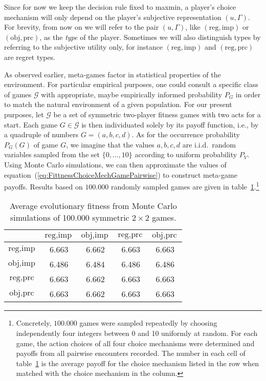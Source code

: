 \documentclass[fleqn,reqno,12pt]{article}
\theoremstyle{Satz}
\theoremstyle{Bsp}
\begin{document}
Since for now we keep the decision rule fixed to maxmin, a player's choice mechanism will only depend on the player's subjective representation $ (u,\Gamma) $. For brevity, from now on we will refer to the pair $ (u,\Gamma)$, like $(\text{reg}, \text{imp})$ or $(\text{obj}, \text{prc})$, as the \textit{type} of the player. Sometimes we will also distinguish types by referring to the subjective utility only, for instance $(\text{reg}, \text{imp})$ and $(\text{reg}, \text{prc})$ are regret types.

As observed earlier, meta-games factor in statistical properties of the environment. For particular
empirical purposes, one could consult a specific class of games $\mathcal{G}$ with appropriate,
maybe empirically informed probability $P_G$ in order to match the natural
environment of a given population. For our present purposes, let $\mathcal{G}$ be a set of symmetric
two-player fitness games with two acts for a start. Each game $G \in \mathcal{G}$ is then individuated solely by its payoff
function, i.e., by a quadruple of numbers $G=(a,b,c,d)$. As for the occurrence probability
$P_G(G)$ of game $G$, we imagine that the values $a,b,c,d$ are i.i.d.~random
variables sampled from the set $ \lbrace 0, \dots, 10 \rbrace$ according to uniform probability
$P_{V}$. Using Monte Carlo simulations, we can then approximate the values of
equation~(\ref{eq:FittnessChoiceMechGamePairwise}) to construct meta-game payoffs. Results
based on $100.000$ randomly sampled games are given in
table~\ref{tab:ExpectedFitness_4Types}.\footnote{Concretely, $100.000$ games were sampled
  repeatedly by choosing independently four integers between 0 and 10 uniformly at random. For
  each game, the action choices of all four choice mechanisms were determined and payoffs from
  all pairwise encounters recorded. The number in each cell of
  table~\ref{tab:ExpectedFitness_4Types} is the average payoff for the choice mechanism listed
  in the row when matched with the choice mechanism in the column.}

\begin{table}[t]
\centering
\begin{tabular}{ccccc}
  \toprule
 & $\text{reg}, \text{imp}$ 
 & $\text{obj}, \text{imp}$ 
 & $\text{reg}, \text{prc}$ 
 & $\text{obj}, \text{prc}$ \\ 
  \midrule
  $\text{reg}, \text{imp}$ & 6.663 & 6.662 & 6.663 & 6.663 \\ 
  $\text{obj}, \text{imp}$ & 6.486 & 6.484 & 6.486 & 6.486 \\ 
  $\text{reg}, \text{prc}$ & 6.663 & 6.662 & 6.663 & 6.663 \\  
  $\text{obj}, \text{prc}$ & 6.663 & 6.662 & 6.663 & 6.663 \\ 
   \bottomrule
\end{tabular}                    
\caption{Average evolutionary fitness from Monte Carlo simulations of 100.000 symmetric $2 \times 2$ games.}
\label{tab:ExpectedFitness_4Types}
\end{table}
\end{document}
